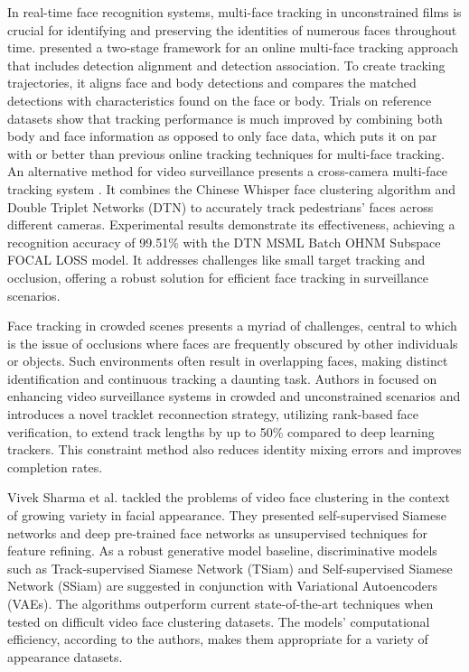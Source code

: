 In real-time face recognition systems, multi-face tracking in unconstrained films is crucial for identifying and preserving the identities of numerous faces throughout time. \cite{weng_online_2023} presented a two-stage framework for an online multi-face tracking approach that includes detection alignment and detection association. To create tracking trajectories, it aligns face and body detections and compares the matched detections with characteristics found on the face or body. Trials on reference datasets show that tracking performance is much improved by combining both body and face information as opposed to only face data, which puts it on par with or better than previous online tracking techniques for multi-face tracking. An alternative method for video surveillance presents a cross-camera multi-face tracking system \cite{ren_cross-camera_2021}. It combines the Chinese Whisper face clustering algorithm and Double Triplet Networks (DTN) to accurately track pedestrians' faces across different cameras. Experimental results demonstrate its effectiveness, achieving a recognition accuracy of 99.51\% with the DTN MSML Batch OHNM Subspace FOCAL LOSS model. It addresses challenges like small target tracking and occlusion, offering a robust solution for efficient face tracking in surveillance scenarios.

Face tracking in crowded scenes presents a myriad of challenges, central to which is the issue of occlusions where faces are frequently obscured by other individuals or objects. Such environments often result in overlapping faces, making distinct identification and continuous tracking a daunting task. Authors in \cite{barquero_rank-based_2021} focused on enhancing video surveillance systems in crowded and unconstrained scenarios and introduces a novel tracklet reconnection strategy, utilizing rank-based face verification, to extend track lengths by up to 50\% compared to deep learning trackers. This constraint method also reduces identity mixing errors and improves completion rates.

Vivek Sharma et al. \cite{sharma_video_2020} tackled the problems of video face clustering in the context of growing variety in facial appearance. They presented self-supervised Siamese networks and deep pre-trained face networks as unsupervised techniques for feature refining. As a robust generative model baseline, discriminative models such as Track-supervised Siamese Network (TSiam) and Self-supervised Siamese Network (SSiam) are suggested in conjunction with Variational Autoencoders (VAEs). The algorithms outperform current state-of-the-art techniques when tested on difficult video face clustering datasets. The models' computational efficiency, according to the authors, makes them appropriate for a variety of appearance datasets.